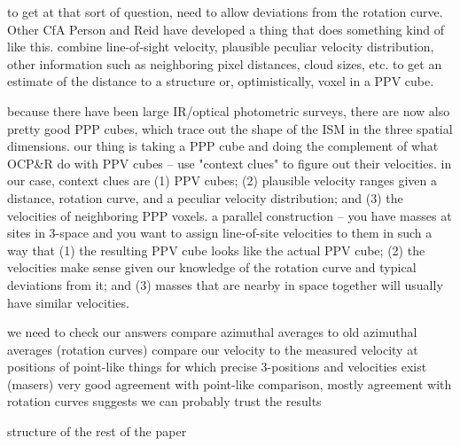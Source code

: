 to get at that sort of question, need to allow deviations from the rotation curve.
Other CfA Person and Reid have developed a thing that does something kind of like this. 
combine line-of-sight velocity, plausible peculiar velocity distribution, other information such as neighboring pixel distances, cloud sizes, etc. to get an estimate of the distance to a structure or, optimistically, voxel in a PPV cube.

because there have been large IR/optical photometric surveys, there are now also pretty good PPP cubes, which trace out the shape of the ISM in the three spatial dimensions. 
our thing is taking a PPP cube and doing the complement of what OCP\&R do with PPV cubes -- use "context clues" to figure out their velocities.
in our case, context clues are (1) PPV cubes; (2) plausible velocity ranges given a distance, rotation curve, and a peculiar velocity distribution; and (3) the velocities of neighboring PPP voxels. 
a parallel construction -- you have masses at sites in 3-space and you want to assign line-of-site velocities to them in such a way that (1) the resulting PPV cube looks like the actual PPV cube; (2) the velocities make sense given our knowledge of the rotation curve and typical deviations from it; and (3) masses that are nearby in space together will usually have similar velocities.

we need to check our answers
compare azimuthal averages to old azimuthal averages (rotation curves)
compare our velocity to the measured velocity at positions of point-like things for which precise 3-positions and velocities exist (masers)
very good agreement with point-like comparison, mostly agreement with rotation curves suggests we can probably trust the results

structure of the rest of the paper